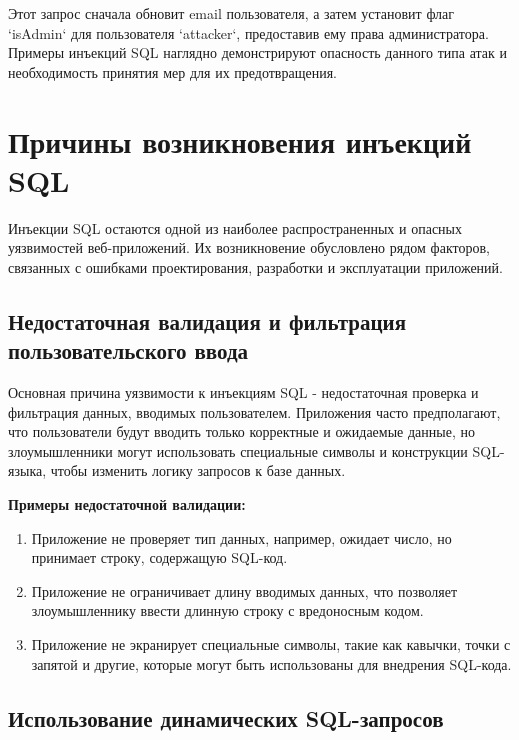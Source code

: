 \documentclass[a4paper,12pt]{diplom}
\begin{document}
	Этот запрос сначала обновит email пользователя, а затем установит флаг `isAdmin` для пользователя `attacker`,  предоставив ему права администратора. 
	Примеры инъекций SQL наглядно демонстрируют опасность данного типа атак и необходимость принятия мер для их предотвращения.
	
	
	
	
	
	
	
	
	\section{Причины возникновения инъекций SQL}
	
	Инъекции SQL остаются одной из наиболее распространенных и опасных уязвимостей веб-приложений.  Их возникновение обусловлено рядом факторов, связанных с ошибками проектирования, разработки и эксплуатации приложений.
	
	\subsection{Недостаточная валидация и фильтрация пользовательского ввода}
	
	Основная причина уязвимости к инъекциям SQL - недостаточная проверка и фильтрация данных, вводимых пользователем.  Приложения часто предполагают, что пользователи будут вводить только корректные и ожидаемые данные,  но злоумышленники могут использовать специальные символы и конструкции SQL-языка, чтобы изменить логику запросов к базе данных.  
	
	\textbf{Примеры недостаточной валидации:}
	
	\begin{enumerate}[label=\arabic{enumi})]
		\item Приложение не проверяет тип данных, например, ожидает число, но принимает строку, содержащую SQL-код.
		\item Приложение не ограничивает длину вводимых данных, что позволяет злоумышленнику ввести длинную строку с вредоносным кодом.
		\item Приложение не экранирует специальные символы, такие как кавычки, точки с запятой и другие, которые могут быть использованы для внедрения SQL-кода.
	\end{enumerate}
	
	\subsection{Использование динамических SQL-запросов}
	
\end{document}

